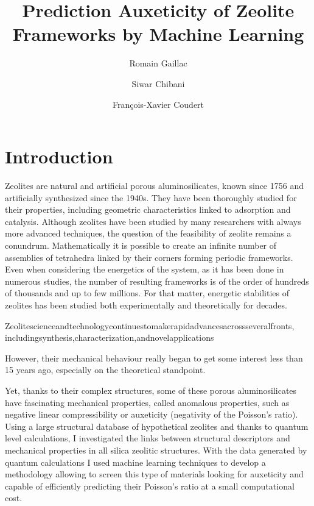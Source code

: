 \documentclass[journal=jacsat,manuscript=article]{achemso}
\author{Romain Gaillac}
\affiliation[XXXXX]
{XXXXXX}
\author{Siwar Chibani}
\affiliation[PSL University]
{Chimie ParisTech, PSL University, CNRS, Institut de Recherche de Chimie Paris, 75005 Paris, France}
\author{Fran\c{c}ois-Xavier Coudert}
\affiliation[PSL University]
{Chimie ParisTech, PSL University, CNRS, Institut de Recherche de Chimie Paris, 75005 Paris, France}
\title{Prediction Auxeticity of Zeolite Frameworks by Machine Learning}
\begin{document}
\begin{tocentry}

\end{tocentry}
\begin{abstract}

\end{abstract}



\section{Introduction}

Zeolites are natural and artificial porous aluminosilicates, known since 1756 and artificially synthesized since the 1940s. They have been thoroughly studied for their properties, including geometric characteristics linked to adsorption and catalysis. Although zeolites have been studied by many researchers with always more advanced techniques, the question of the feasibility of zeolite remains a conundrum. Mathematically it is possible to create an infinite number of assemblies of tetrahedra linked by their corners forming periodic frameworks.\cite{Treacy1997768} Even when considering the energetics of the system, as it has been done in numerous studies, the number of resulting frameworks is of the order of hundreds of thousands and up to few millions.\cite{woodley_crystal_2008,friedrichs_systematic_1999,treacy_enumeration_2004} For that matter, energetic stabilities of zeolites has been studied both experimentally and theoretically for decades.

Zeolitescienceandtechnologycontinuestomakerapidadvancesacrossseveralfronts,
includingsynthesis,characterization,andnovelapplications


However, their mechanical behaviour really began to get some interest less than 15 years ago, especially on the theoretical standpoint. 


Yet, thanks to their complex structures, some of these porous aluminosilicates have fascinating mechanical properties, called anomalous properties, such as negative linear compressibility or auxeticity (negativity of the Poisson's ratio). Using a large structural database of hypothetical zeolites and thanks to quantum level calculations, I investigated the links between structural descriptors and mechanical properties in all silica zeolitic structures. With the data generated by quantum calculations I used machine learning techniques to develop a methodology allowing to screen this type of materials looking for auxeticity and capable of efficiently predicting their Poisson's ratio at a small computational cost.
\end{document}
